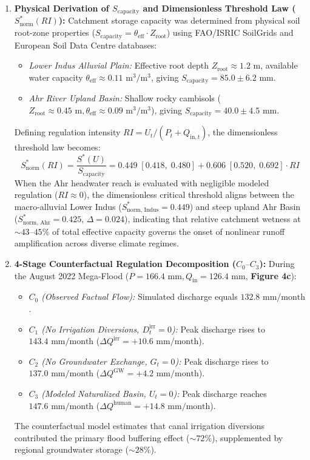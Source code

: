 \documentclass[11pt,a4paper,fleqn]{article}
\begin{document}
\begin{enumerate}
    \item \textbf{Physical Derivation of $S_{\text{capacity}}$ and Dimensionless Threshold Law ($S_{\text{norm}}^*(RI)$):} Catchment storage capacity was determined from physical soil root-zone properties ($S_{\text{capacity}} = \theta_{\text{eff}} \cdot Z_{\text{root}}$) using FAO/ISRIC SoilGrids and European Soil Data Centre databases:
    \begin{itemize}
        \item \emph{Lower Indus Alluvial Plain:} Effective root depth $Z_{\text{root}} \approx 1.2\text{ m}$, available water capacity $\theta_{\text{eff}} \approx 0.11\text{ m}^3/\text{m}^3$, giving $S_{\text{capacity}} = 85.0 \pm 6.2\text{ mm}$.
        \item \emph{Ahr River Upland Basin:} Shallow rocky cambisols ($Z_{\text{root}} \approx 0.45\text{ m}, \theta_{\text{eff}} \approx 0.09\text{ m}^3/\text{m}^3$), giving $S_{\text{capacity}} = 40.0 \pm 4.5\text{ mm}$.
    \end{itemize}
    Defining regulation intensity $RI = U_t / (P_t + Q_{\text{in},t})$, the dimensionless threshold law becomes:
    \begin{equation}
    S_{\text{norm}}^*(RI) = \frac{S^*(U)}{S_{\text{capacity}}} = 0.449 \; [0.418, \; 0.480] + 0.606 \; [0.520, \; 0.692] \cdot RI
    \end{equation}
    When the Ahr headwater reach is evaluated with negligible modeled regulation ($RI \approx 0$), the dimensionless critical threshold aligns between the macro-alluvial Lower Indus ($S_{\text{norm, Indus}}^* = 0.449$) and steep upland Ahr Basin ($S_{\text{norm, Ahr}}^* = 0.425$, $\Delta = 0.024$), indicating that relative catchment wetness at $\sim 43\text{--}45\%$ of total effective capacity governs the onset of nonlinear runoff amplification across diverse climate regimes.
    \item \textbf{4-Stage Counterfactual Regulation Decomposition ($C_0\text{--}C_3$):} During the August 2022 Mega-Flood ($P = 166.4\text{ mm}, Q_{\text{in}} = 126.4\text{ mm}$, \textbf{Figure 4c}):
    \begin{itemize}
        \item \emph{$C_0$ (Observed Factual Flow):} Simulated discharge equals $132.8\text{ mm/month}$.
        \item \emph{$C_1$ (No Irrigation Diversions, $D_t^{\text{irr}} = 0$):} Peak discharge rises to $143.4\text{ mm/month}$ ($\Delta Q^{\text{irr}} = +10.6\text{ mm/month}$).
        \item \emph{$C_2$ (No Groundwater Exchange, $G_t = 0$):} Peak discharge rises to $137.0\text{ mm/month}$ ($\Delta Q^{\text{GW}} = +4.2\text{ mm/month}$).
        \item \emph{$C_3$ (Modeled Naturalized Basin, $U_t = 0$):} Peak discharge reaches $147.6\text{ mm/month}$ ($\Delta Q^{\text{human}} = +14.8\text{ mm/month}$).
    \end{itemize}
    The counterfactual model estimates that canal irrigation diversions contributed the primary flood buffering effect ($\sim 72\%$), supplemented by regional groundwater storage ($\sim 28\%$).
\end{enumerate}
\end{document}
